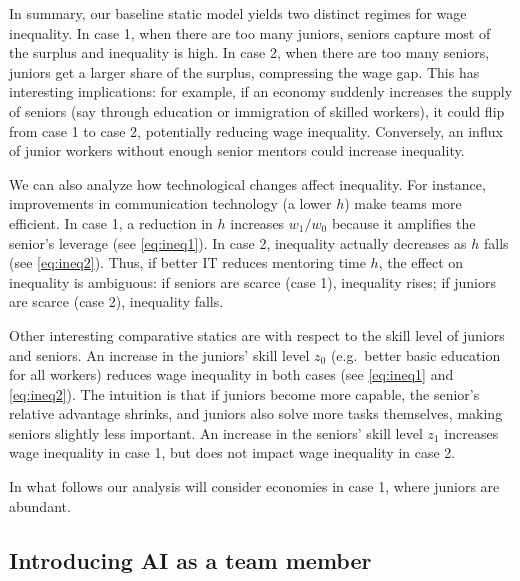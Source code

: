 \documentclass[12pt]{article}
\begin{document}
In summary, our baseline static model yields two distinct regimes for wage inequality. In case 1, when there are too many juniors, seniors capture most of the surplus and inequality is high. In case 2, when there are too many seniors, juniors get a larger share of the surplus, compressing the wage gap. This has interesting implications: for example, if an economy suddenly increases the supply of seniors (say through education or immigration of
skilled workers), it could flip from case 1 to case 2, potentially reducing wage inequality. Conversely, an influx of junior workers without enough senior mentors could increase inequality.

We can also analyze how technological changes affect inequality. For instance, improvements in communication technology (a lower \(h\)) make teams more efficient. In case 1, a reduction in \(h\) increases \(w_1/w_0\) because it amplifies the senior's leverage (see \eqref{eq:ineq1}). In case 2, inequality actually decreases as \(h\)
falls (see \eqref{eq:ineq2}). Thus, if better IT reduces mentoring time \(h\), the effect on inequality is ambiguous: if
seniors are scarce (case 1), inequality rises; if juniors are scarce (case 2), inequality falls. %

Other interesting comparative statics are with respect to the skill level of juniors and seniors. An increase in the juniors' skill level \(z_0\) (e.g.\ better basic education for all workers) reduces wage inequality in both cases (see \eqref{eq:ineq1} and \eqref{eq:ineq2}). The intuition is that if juniors become more capable, the senior's relative advantage shrinks, and juniors also solve more tasks themselves, making seniors slightly less important. An increase in the seniors' skill level $z_1$ increases wage inequality in case 1, but does not impact wage inequality in case 2. 

In what follows our analysis will consider economies in case 1, where juniors are abundant. 


\subsection{Introducing AI as a team member}\label{introducing-ai-as-a-team-member}
\end{document}

